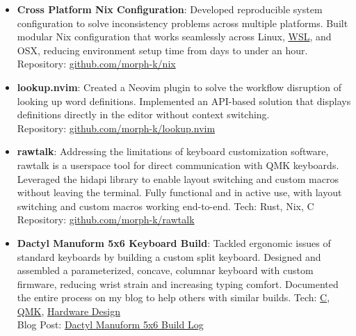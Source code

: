 \documentclass[a4paper,11pt]{article}
\newcommand{\resumeItem}[2]{
  \item\small{
    \textbf{#1}{: #2 \vspace{-2pt}}
  }
}
\newcommand{\resumeSubItem}[2]{\resumeItem{#1}{#2}\vspace{-3pt}}
\begin{document}
\begin{itemize}[leftmargin=0pt, label={}]
 \resumeSubItem{\textbf{Cross Platform Nix Configuration}}{Developed reproducible system configuration to solve inconsistency problems across multiple platforms. Built modular Nix configuration that works seamlessly across Linux, \href{https://github.com/microsoft/WSL}{WSL}, and OSX, reducing environment setup time from days to under an hour. \\Repository: \href{https://github.com/morph-k/nix.git}{github.com/morph-k/nix}}
 \vspace{2pt}
 
 \resumeSubItem{\textbf{lookup.nvim}}{Created a Neovim plugin to solve the workflow disruption of looking up word definitions. Implemented an API-based solution that displays definitions directly in the editor without context switching. \\Repository: \href{https://github.com/morph-k/lookup.nvim}{github.com/morph-k/lookup.nvim}}
 \vspace{2pt}
 
 \resumeSubItem{\textbf{rawtalk}}{Addressing the limitations of keyboard customization software, rawtalk is a userspace tool for direct communication with QMK keyboards. Leveraged the hidapi library to enable layout switching and custom macros without leaving the terminal. Fully functional and in active use, with layout switching and custom macros working end-to-end. Tech: Rust, Nix, C \\Repository: \href{https://github.com/morph-k/rawtalk.git}{github.com/morph-k/rawtalk}}
 \vspace{2pt}
 
 \resumeSubItem{\textbf{Dactyl Manuform 5x6 Keyboard Build}}{Tackled ergonomic issues of standard keyboards by building a custom split keyboard. Designed and assembled a parameterized, concave, columnar keyboard with custom firmware, reducing wrist strain and increasing typing comfort. Documented the entire process on my blog to help others with similar builds. Tech: \href{https://www.cs.sfu.ca/~ashriram/Courses/CS295/assets/books/C_Book_2nd.pdf}{C}, \href{https://qmk.fm/}{QMK}, \href{https://engineering.purdue.edu/ece477/Course/Lectures/Slides/7-HardwareDesignFundamentals.pdf}{Hardware Design} \\Blog Post: \href{https://morphykuffour.github.io/keyboards,/ergonomics,/qmk/2021/12/29/Dactyl-Manuform.html}{Dactyl Manuform 5x6 Build Log}}
\vspace{2pt}
\end{itemize}
\end{document}

